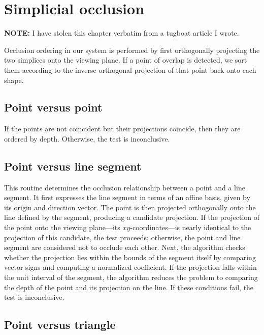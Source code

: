 \chapter{Simplicial occlusion}

\textbf{NOTE:} I have stolen this chapter verbatim from a tugboat 
article I wrote.

Occlusion ordering in our system is performed by first orthogonally 
projecting the two simplices onto the viewing plane. If a point of 
overlap is detected, we sort them according to the inverse orthogonal 
projection of that point back onto each shape.

\section{Point versus point}

If the points are not coincident but their projections coincide, 
then they are ordered by depth. Otherwise, the test is
inconclusive.

\section{Point versus line segment}

This routine determines the occlusion relationship between a point 
and a line segment. It first expresses the line segment in terms of 
an affine basis, given by its origin and direction vector. The point 
is then projected orthogonally onto the line defined by the segment, 
producing a candidate projection. If the projection of the point onto 
the viewing plane---its \(xy\)-coordinates---is nearly 
identical to the projection of this candidate, the test proceeds; 
otherwise, the point 
and line segment are considered not to occlude each other. Next, the 
algorithm checks whether the projection lies within the bounds of the 
segment itself by comparing vector signs and computing a normalized 
coefficient. If the projection falls within the unit interval of the 
segment, the algorithm reduces the problem to comparing the depth of 
the point and its projection on the line. If these conditions fail, 
the test is inconclusive.

\section{Point versus triangle}

